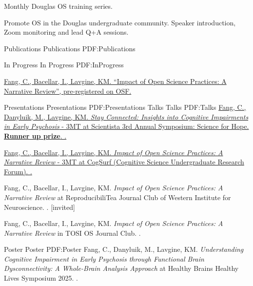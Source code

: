 \documentclass[a4paper,12pt]{article}
\begin{document}
\begin{Body}
Monthly Douglas OS training series. 
\begin{Detail}
\BulletItem
Promote OS in the Douglas undergraduate community. 
\BulletItem
Speaker introduction, Zoom monitoring and lead Q+A sessions.
\end{Detail}

\Section
{Publications}
{Publications}
{PDF:Publications}

\SubSection
{In Progress}
{In Progress}
{PDF:InProgress}

\begingroup
\renewcommand{\MaxNumberedItem}{[88]}

\Gap
\NumberedItem{[1]}
\href{https://doi.org/10.17605/OSF.IO/QPZF5}
{\underline{Fang, C.}, Bacellar, I., Lavgine, KM.
``Impact of Open Science Practices: A Narrative Review'', pre-registered on OSF.
}
\endgroup

\BigGap
\Section
{Presentations}
{Presentations}
{PDF:Presentations}
\begingroup
\renewcommand{\MaxNumberedItem}{[88]}
\SubSection
{Talks}
{Talks}
{PDF:Talks}
\Gap
\NumberedItem{[1]}
\href{https://scientistamcgill.wordpress.com/3-mt-presentations-2024/}
{Fang, C., Danyluik, M., Lavgine, KM.
\textit{Stay Connected: Insights into Cognitive Impairments in Early Psychosis} - 3MT 
at Scientista 3rd Annual Symposium: Science for Hope. \textbf{Runner up prize}.
.}

\Gap
\NumberedItem{[2]}
\href{https://www.cogsurf.org}
{Fang, C., Bacellar, I., Lavgine, KM.
\textit{Impact of Open Science Practices: A Narrative Review} - 3MT 
at CogSurf (Cognitive Science
Undergraduate Research Forum).
.}

\Gap
\NumberedItem{[3]}
{Fang, C., Bacellar, I., Lavgine, KM.
\textit{Impact of Open Science Practices: A Narrative Review}
at ReproducibiliTea Journal Club of Western Institute for Neuroscience. 
. [invited]}

\Gap
\NumberedItem{[4]}
{Fang, C., Bacellar, I., Lavgine, KM.
\textit{Impact of Open Science Practices: A Narrative Review}
in TOSI OS Journal Club.
.}

\SubSection
{Poster}
{Poster}
{PDF:Poster}
\Gap
\NumberedItem{[1]}
{Fang, C., Danyluik, M., Lavgine, KM.
\textit{Understanding Cognitive Impairment in Early Psychosis through Functional Brain Dysconnectivity: A Whole-Brain Analysis Approach} at Healthy Brains Healthy Lives Symposium 2025.
.}


\end{Body}
\end{document}
